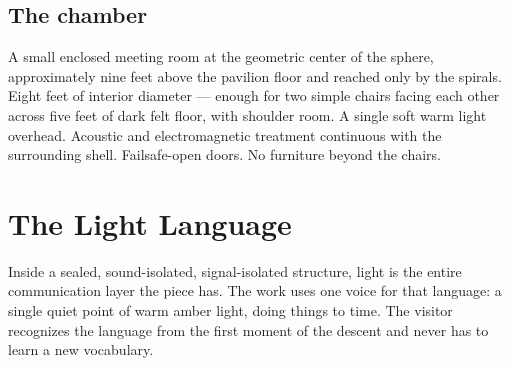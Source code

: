 \documentclass[]{anvil-installation}
\begin{document}
\subsection{The chamber}

A small enclosed meeting room at the geometric center of the sphere, approximately nine feet above the pavilion floor and reached only by the spirals. Eight feet of interior diameter --- enough for two simple chairs facing each other across five feet of dark felt floor, with shoulder room. A single soft warm light overhead. Acoustic and electromagnetic treatment continuous with the surrounding shell. Failsafe-open doors. No furniture beyond the chairs.

\section{The Light Language}

Inside a sealed, sound-isolated, signal-isolated structure, light is the entire communication layer the piece has. The work uses one voice for that language: a single quiet point of warm amber light, doing things to time. The visitor recognizes the language from the first moment of the descent and never has to learn a new vocabulary.
\end{document}
